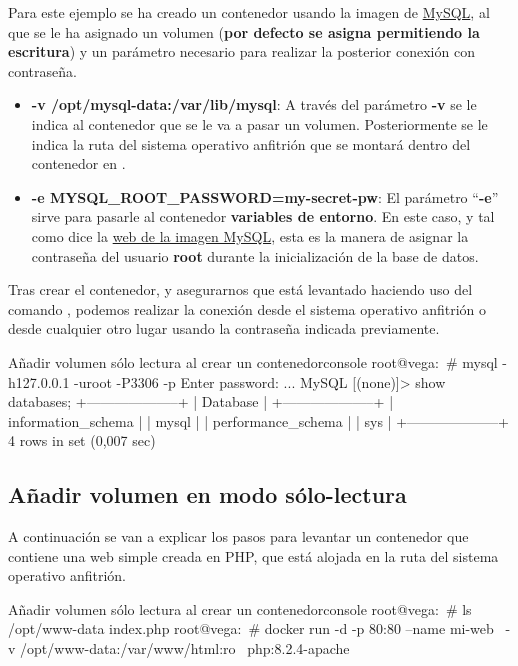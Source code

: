 Para este ejemplo se ha creado un contenedor usando la imagen de \href{https://hub.docker.com/_/mysql}{MySQL}, al que se le ha asignado un volumen (\textbf{por defecto se asigna permitiendo la escritura}) y un parámetro necesario para realizar la posterior conexión con contraseña.

\begin{itemize}
    \item \textbf{-v /opt/mysql-data:/var/lib/mysql}: A través del parámetro \textbf{-v} se le indica al contenedor que se le va a pasar un volumen. Posteriormente se le indica la ruta del sistema operativo anfitrión  que se montará dentro del contenedor en .
    \item \textbf{-e MYSQL\_ROOT\_PASSWORD=my-secret-pw}: El parámetro “\textbf{-e}” sirve para pasarle al contenedor \textbf{variables de entorno}. En este caso, y tal como dice la \href{https://hub.docker.com/_/mysql}{web de la imagen MySQL}, esta es la manera de asignar la contraseña del usuario \textbf{root} durante la inicialización de la base de datos.
\end{itemize}

Tras crear el contenedor, y asegurarnos que está levantado haciendo uso del comando , podemos realizar la conexión desde el sistema operativo anfitrión o desde cualquier otro lugar usando la contraseña indicada previamente.

\begin{mycode}{Añadir volumen sólo lectura al crear un contenedor}{console}{{\small }}
root@vega:~# mysql -h127.0.0.1 -uroot -P3306 -p
    Enter password:
    ...
    MySQL [(none)]> show databases;
    +--------------------+
    | Database           |
    +--------------------+
    | information_schema |
    | mysql              |
    | performance_schema |
    | sys                |
    +--------------------+
    4 rows in set (0,007 sec)
\end{mycode}

\subsection{Añadir volumen en modo sólo-lectura}
A continuación se van a explicar los pasos para levantar un contenedor que contiene una web simple creada en PHP, que está alojada en la ruta  del sistema operativo anfitrión.


\begin{mycode}{Añadir volumen sólo lectura al crear un contenedor}{console}{}
root@vega:~# ls /opt/www-data
index.php
root@vega:~# docker run -d -p 80:80 --name mi-web \
    -v /opt/www-data:/var/www/html:ro \
    php:8.2.4-apache
\end{mycode}

